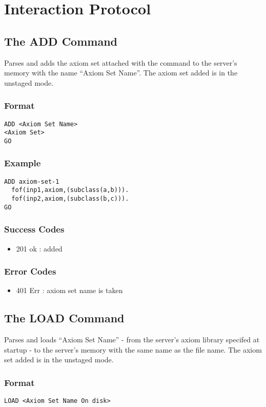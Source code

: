 \chapter{Interaction Protocol}\label{chap:interactionProtocol}

\section{The ADD Command}
Parses and adds the axiom set attached with the command to the server's memory with the name ``Axiom Set Name''. The axiom set added is in the unstaged mode.
\subsection{Format}
\begin{lstlisting}
ADD <Axiom Set Name>
<Axiom Set>
GO
\end{lstlisting}
\subsection{Example}
\begin{lstlisting}
ADD axiom-set-1
  fof(inp1,axiom,(subclass(a,b))).
  fof(inp2,axiom,(subclass(b,c))).
GO
\end{lstlisting}
\subsection{Success Codes}
\begin{itemize}
    \item 201 ok : added
\end{itemize}
\subsection{Error Codes}
\begin{itemize}
    \item 401 Err : axiom set name is taken
\end{itemize}
\clearpage

\section{The LOAD Command}
Parses and loads ``Axiom Set Name'' - from the server's axiom library specifed at startup - to the server's memory with the same name as the file name. The axiom set added is in the unstaged mode.
\subsection{Format}
\begin{lstlisting}
LOAD <Axiom Set Name On disk>
\end{lstlisting}
